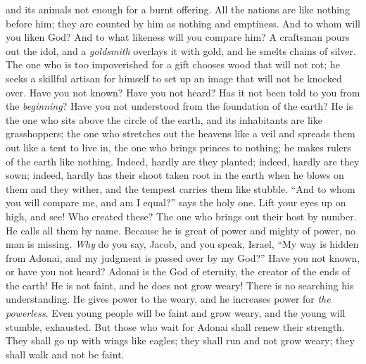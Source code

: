 \begin{biblechapter}
and its animals not enough for a burnt offering.
\verse All the nations are like nothing before him; 
they are counted by him as nothing and emptiness.
\verse And to whom will you liken God? 
And to what likeness will you compare him?
\verse A craftsman pours out the idol, 
and a \textit{goldsmith} overlays it with gold, 
and he smelts chains of silver.
\verse The one who is too impoverished for a gift chooses wood that will not rot; 
he seeks a skillful artisan for himself to set up an image that will not be knocked over.
\verse Have you not known? 
Have you not heard? 
Has it not been told to you from the \textit{beginning}? 
Have you not understood from the foundation of the earth?
\verse He is the one who sits above the circle of the earth, 
and its inhabitants are like grasshoppers; 
the one who stretches out the heavens like a veil 
and spreads them out like a tent to live in,
\verse the one who brings princes to nothing; 
he makes rulers of the earth like nothing.
\verse Indeed, hardly are they planted; indeed, hardly are they sown; 
indeed, hardly has their shoot taken root in the earth 
when he blows on them and they wither, 
and the tempest carries them like stubble.
\verse “And to whom you will compare me, and am I equal?” says the holy one.
\verse Lift your eyes up on high, and see! Who created these? 
The one who brings out their host by number. 
He calls all them by name. 
Because he is great of power 
and mighty of power, no man is missing.
\verse \textit{Why} do you say, Jacob, 
and you speak, Israel, 
“My way is hidden from Adonai, 
and my judgment is passed over by my God?”
\verse Have you not known, 
or have you not heard? 
Adonai is the God of eternity, 
the creator of the ends of the earth! 
He is not faint, and he does not grow weary! 
There is no searching his understanding.
\verse He gives power to the weary, 
and he increases power for \textit{the powerless}.
\verse Even young people will be faint and grow weary, 
and the young will stumble, exhausted.
\verse But those who wait for Adonai shall renew their strength. 
They shall go up with wings like eagles; 
they shall run and not grow weary; 
they shall walk and not be faint.
\end{biblechapter}

